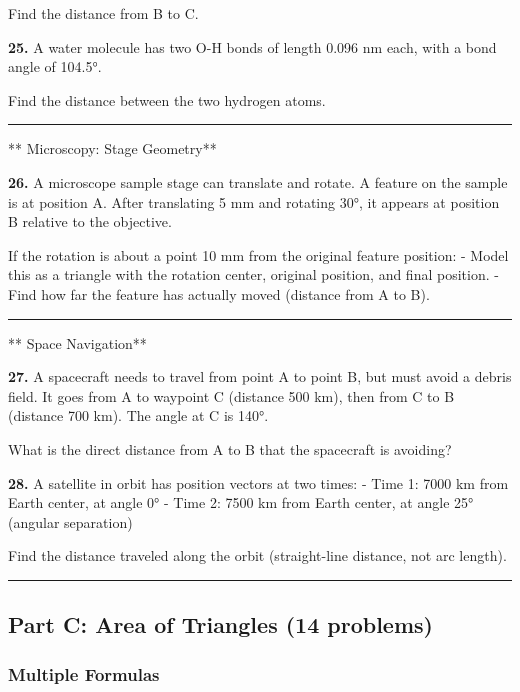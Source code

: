 \documentclass[
  11pt,
]{article}
\begin{document}
Find the distance from B to C.

\textbf{25.} A water molecule has two O-H bonds of length 0.096 nm each,
with a bond angle of 104.5°.

Find the distance between the two hydrogen atoms.

\begin{center}\rule{0.5\linewidth}{0.5pt}\end{center}

** Microscopy: Stage Geometry**

\textbf{26.} A microscope sample stage can translate and rotate. A
feature on the sample is at position A. After translating 5 mm and
rotating 30°, it appears at position B relative to the objective.

If the rotation is about a point 10 mm from the original feature
position: - Model this as a triangle with the rotation center, original
position, and final position. - Find how far the feature has actually
moved (distance from A to B).

\begin{center}\rule{0.5\linewidth}{0.5pt}\end{center}

** Space Navigation**

\textbf{27.} A spacecraft needs to travel from point A to point B, but
must avoid a debris field. It goes from A to waypoint C (distance 500
km), then from C to B (distance 700 km). The angle at C is 140°.

What is the direct distance from A to B that the spacecraft is avoiding?

\textbf{28.} A satellite in orbit has position vectors at two times: -
Time 1: 7000 km from Earth center, at angle 0° - Time 2: 7500 km from
Earth center, at angle 25° (angular separation)

Find the distance traveled along the orbit (straight-line distance, not
arc length).

\begin{center}\rule{0.5\linewidth}{0.5pt}\end{center}

\hypertarget{part-c-area-of-triangles-14-problems}{%
\subsection{Part C: Area of Triangles (14
problems)}\label{part-c-area-of-triangles-14-problems}}

\hypertarget{multiple-formulas}{%
\subsubsection{Multiple Formulas}\label{multiple-formulas}}
\end{document}
